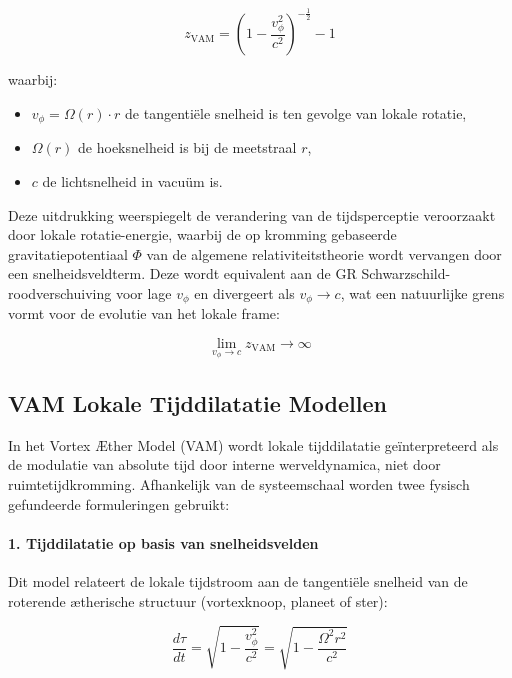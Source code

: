 \begin{equation}
    z_\text{VAM} =
    \left( 1 - \frac{v_\phi^2}{c^2} \right)^{-\frac{1}{2}} - 1
\end{equation}

waarbij:
\begin{itemize}
    \item \( v_\phi = \Omega(r) \cdot r \) de tangentiële snelheid is ten gevolge van lokale rotatie,
    \item \( \Omega(r) \) de hoeksnelheid is bij de meetstraal \( r \),
    \item \( c \) de lichtsnelheid in vacuüm is.
\end{itemize}

Deze uitdrukking weerspiegelt de verandering van de tijdsperceptie veroorzaakt door lokale rotatie-energie, waarbij de op kromming gebaseerde gravitatiepotentiaal \( \Phi \) van de algemene relativiteitstheorie wordt vervangen door een snelheidsveldterm. Deze wordt equivalent aan de GR Schwarzschild-roodverschuiving voor lage \( v_\phi \) en divergeert als \( v_\phi \rightarrow c \), wat een natuurlijke grens vormt voor de evolutie van het lokale frame:

\begin{equation}
    \lim_{v_\phi \to c} z_\text{VAM} \to \infty
\end{equation}

\subsection*{VAM Lokale Tijddilatatie Modellen}

In het Vortex Æther Model (VAM) wordt lokale tijddilatatie geïnterpreteerd als de modulatie van absolute tijd door interne werveldynamica, niet door ruimtetijdkromming. Afhankelijk van de systeemschaal worden twee fysisch gefundeerde formuleringen gebruikt:

\paragraph{1. Tijddilatatie op basis van snelheidsvelden}

Dit model relateert de lokale tijdstroom aan de tangentiële snelheid van de roterende ætherische structuur (vortexknoop, planeet of ster):

\begin{equation}
    \frac{d\tau}{dt} =
    \sqrt{1 - \frac{v_\phi^2}{c^2}} =
    \sqrt{1 - \frac{\Omega^2 r^2}{c^2}}
\end{equation}

